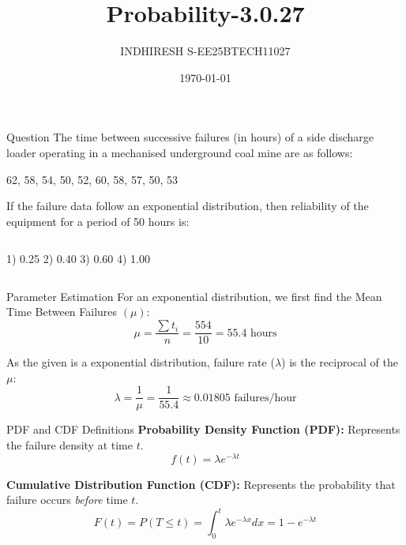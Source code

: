 \documentclass{beamer}
\title{Probability-3.0.27}
\author{INDHIRESH S-EE25BTECH11027}
\date{\today}
\begin{document}
\begin{frame}
    \titlepage
\end{frame}

\begin{frame}{Question}
The time between successive failures (in hours) of a side discharge loader operating in a mechanised underground coal mine are as follows:
\begin{center}
    62, 58, 54, 50, 52, 60, 58, 57, 50, 53
\end{center}
If the failure data follow an exponential distribution, then reliability of the equipment for a period of 50 hours is:
\vspace{30pt}
\begin{columns}[t]
    1) 0.25
    2) 0.40
    3) 0.60
    4) 1.00
\end{columns}
\end{frame}


\begin{frame}{ Parameter Estimation}
    For an exponential distribution, we first find the Mean Time Between Failures $(\mu)$:
    \begin{equation*}
       \mu = \frac{\sum t_i}{n} = \frac{554}{10} = 55.4 \text{ hours}
    \end{equation*}
    
    As the given is a exponential distribution, failure rate ($\lambda$) is the reciprocal of the $\mu$:
    \begin{equation*}
        \lambda = \frac{1}{\mu} = \frac{1}{55.4} \approx 0.01805 \text{ failures/hour}
    \end{equation*}
\end{frame}

\begin{frame}{ PDF and CDF Definitions}
    \textbf{Probability Density Function (PDF):}
    Represents the failure density at time $t$.
    \begin{equation*}
        f(t) = \lambda e^{-\lambda t}
    \end{equation*}

    \textbf{Cumulative Distribution Function (CDF):}
    Represents the probability that failure occurs \textit{before} time $t$.
    \begin{equation*}
        F(t) = P(T \le t) = \int_{0}^{t} \lambda e^{-\lambda x} dx = 1 - e^{-\lambda t}
    \end{equation*}
\end{frame}
\end{document}
